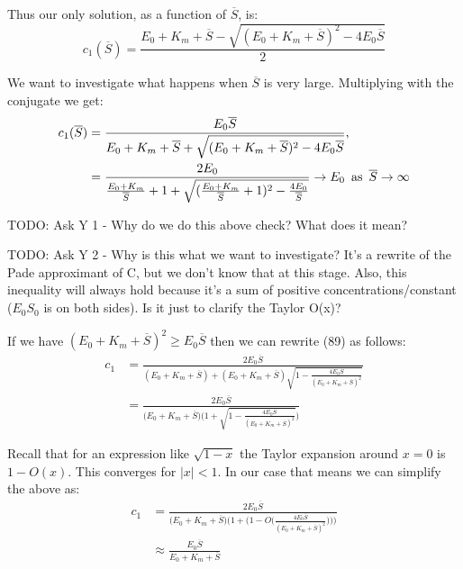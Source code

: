 \documentclass[12pt]{article}
\begin{document}
Thus our only solution, as a function of $\overline{S}$, is:
\begin{equation}
  c_1(\overline{S}) = \frac{E_0 + K_m + \overline{S} - \sqrt{(E_0 +
      K_m + \overline{S})^2 - 4 E_0 \overline{S}}}{2}
\end{equation}

We want to investigate what happens when $\overline{S}$ is very
large. Multiplying with the conjugate we get:
\begin{align}
  c_1(\overline{S}) &= \frac{E_0 \overline{S}}{E_0 + K_m + \overline{S} +
    \sqrt{(E_0 +K_m + \overline{S})^2 - 4 E_0 \overline{S}}}, \\
                    &= \frac{2 E_0}{\frac{E_0 + K_m}{\overline{S}} + 1 +
    \sqrt{(\frac{E_0 + K_m}{\overline{S}} + 1)^2 - \frac{4 E_0}{\overline{S}}}}
  \to  E_0 \enskip \text{as} \enskip \overline{S} \to \infty
\end{align}

TODO: Ask Y 1 - Why do we do this above check? What does it mean?

TODO: Ask Y 2 - Why is this what we want to investigate? It's a
rewrite of the Pade approximant of C, but we don't know that at this
stage. Also, this inequality will always hold because it's a sum of
positive concentrations/constant ($E_0 S_0$ is on both sides). Is it just
to clarify the Taylor O(x)?

If we have $(E_0 + K_m + \overline{S})^2 \geq E_0 \overline{S}$ then
we can rewrite (89) as follows:
\begin{align}
  c_1 &= \frac{2 E_0 \overline{S}}
              {(E_0 + K_m + \overline{S}) + (E_0 + K_m + \overline{S})
              \sqrt{1- \frac{4 E_0 \overline{S}}
                            {(E_0 + K_m + \overline{S})^2}}} \\
      &= \frac{2 E_0 \overline{S}}
              {\Big(E_0 + K_m + \overline{S}\Big)
              \Big(1 + \sqrt{1- \frac{4 E_0 \overline{S}}
                  {(E_0 + K_m + \overline{S})^2}}\Big)}
\end{align}

Recall that for an expression like $\sqrt{1-x}$ the Taylor expansion
around $x=0$ is $1 - O(x)$. This converges for $|x| < 1$. In our case
that means we can simplify the above as:
\begin{align}
   c_1 &= \frac{2 E_0 \overline{S}}
              {\Big(E_0 + K_m + \overline{S}\Big)
               \Big(1 + \Big(1 -
                O\Big(\frac{4 E_0 \overline{S}}
                           {(E_0 + K_m + \overline{S})^2}\Big)\Big)\Big)} \\
      &\approx \frac{E_0 \overline{S}}
                    {E_0 + K_m + \overline{S}}
\end{align}
\end{document}
